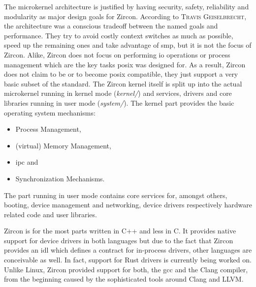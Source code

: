 The microkernel architecture is justified by having security, safety, reliability and modularity as major design goals for Zircon.
According to \textsc{Travis Geiselbrecht}, the architecture was a conscious tradeoff between the named goals and performance\cite{chat-zircon-arch}.
They try to avoid costly context switches as much as possible, speed up the remaining ones and take advantage of \acf{smp}, but it is not the focus of Zircon.
Alike, Zircon does not focus on performing \ac{io} operations or process management which are the key tasks \ac{posix} was designed for\cite{chat-zircon-arch}.
As a result, Zircon does not claim to be or to become \ac{posix} compatible, they just support a very basic subset of the standard\cite{zircon-libc-posix}.
The Zircon kernel itself is split up into the actual microkernel running in kernel mode (\textit{kernel/}) and services, drivers and core libraries running in user mode (\textit{system/})\cite{zircon-intro}.
The kernel part provides the basic operating system mechanisms: 
\begin{itemize}
    \item Process Management,
    \item (virtual) Memory Management,
    \item \acl{ipc} and
    \item Synchronization Mechanisms\cite{zircon-intro}.
\end{itemize}
The part running in user mode contains core services for, amongst others, booting, device management and networking, device drivers respectively hardware related code and user libraries.

Zircon is for the most parts written in C++ and less in C.
It provides native support for device drivers in both languages but due to the fact that Zircon provides an \ac{idl} which defines a contract for in-process drivers, other languages are conceivable as well.
In fact, support for Rust drivers is currently being worked on\cite{chat-zircon-arch}.
Unlike Linux, Zircon provided support for both, the \ac{gcc} and the Clang compiler, from the beginning caused by the sophisticated tools around Clang and LLVM\@.


